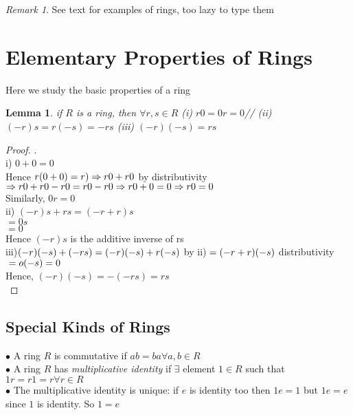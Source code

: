 \documentclass{article}
\theoremstyle{plain}
\newtheorem{lem}[thm]{Lemma}
\theoremstyle{definition}
\theoremstyle{remark}
\newtheorem*{rem}{Remark}
\begin{document}
\begin{rem}
See text for examples of rings, too lazy to type them
\end{rem}

\pagebreak
\section{Elementary Properties of Rings}
Here we study the basic properties of a ring

\begin{lem}
	if $R$ is a ring, then $\forall r,s \in R$
	(i) $r0 = 0r = 0$//
	(ii) $(-r)s = r(-s) = -rs$
	(iii) $(-r)(-s) = rs$
\end{lem}
\begin{proof} . \\
	i) $0 + 0 = 0$\\
	Hence $r(0 + 0) = r) \\
	\Rightarrow r0 + r0 $ by distributivity\\
	$\Rightarrow r0 + r0 - r0 = r0 - r0 \\
	\Rightarrow r0 + 0 = 0 \\
	\Rightarrow r0 = 0 $\\
	Similarly, $0r = 0$\\
	ii) $(-r)s + rs = (-r + r)s$ \\
	$= 0s $\\
	$= 0$ \\
	Hence $(-r)s$ is the additive inverse of rs \\
	iii)$
	(-r)(-s) + (-rs) \\
	=(-r)(-s) + r(-s) $ by ii)$ \\
	= (-r + r)(-s) $ distributivity$ \\
	= o(-s) = 0$ \\
	Hence, $(-r)(-s) = -(-rs) = rs$\\
\end{proof}

\subsection{Special Kinds of Rings}
$\bullet$ A ring $R$ is commutative if $ab = ba \forall a,b \in R$\\
$\bullet$ A ring $R$ has \textit{multiplicative identity} if $\exists$ element $ 1 \in R$ such that $1r = r1 = r \forall r \in R$\\
$\bullet$ The multiplicative identity is unique: if $e$ is identity too then $1e = 1$ but $1e = e$ since $1$ is identity. So $1 = e$
\end{document}
